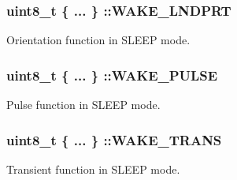 \subsubsection[{W\+A\+K\+E\+\_\+\+L\+N\+D\+P\+R\+T}]{\setlength{\rightskip}{0pt plus 5cm}uint8\+\_\+t \{ ... \} \+::W\+A\+K\+E\+\_\+\+L\+N\+D\+P\+R\+T}\label{group__accel__module_ga057185758916245289d71b3d88917d74}
Orientation function in S\+L\+E\+E\+P mode. \hypertarget{group__accel__module_gad9a7eb32022bcd78e23f51ea3bbb159c}{}
\subsubsection[{W\+A\+K\+E\+\_\+\+P\+U\+L\+S\+E}]{\setlength{\rightskip}{0pt plus 5cm}uint8\+\_\+t \{ ... \} \+::W\+A\+K\+E\+\_\+\+P\+U\+L\+S\+E}\label{group__accel__module_gad9a7eb32022bcd78e23f51ea3bbb159c}
Pulse function in S\+L\+E\+E\+P mode. \hypertarget{group__accel__module_ga618cb0870232afba1d3d23b1eaa355c4}{}
\subsubsection[{W\+A\+K\+E\+\_\+\+T\+R\+A\+N\+S}]{\setlength{\rightskip}{0pt plus 5cm}uint8\+\_\+t \{ ... \} \+::W\+A\+K\+E\+\_\+\+T\+R\+A\+N\+S}\label{group__accel__module_ga618cb0870232afba1d3d23b1eaa355c4}
Transient function in S\+L\+E\+E\+P mode. 